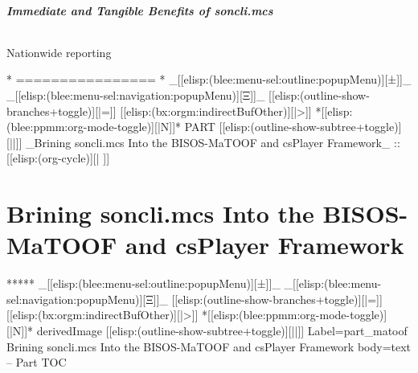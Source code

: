 \begin{whenOrg}
\begin{verblatex}

\begin{frame}[fragile,plain,label=soncliBenefits]
    \frametitle{Immediate and Tangible Benefits of soncli.mcs}
    \framesubtitle{}


    Nationwide reporting




\end{frame}
\end{verblatex}


\begin{whenOrg}
*      ================
*  _[[elisp:(blee:menu-sel:outline:popupMenu)][±]]_ _[[elisp:(blee:menu-sel:navigation:popupMenu)][Ξ]]_ [[elisp:(outline-show-branches+toggle)][|=]] [[elisp:(bx:orgm:indirectBufOther)][|>]] *[[elisp:(blee:ppmm:org-mode-toggle)][|N]]*  PART       [[elisp:(outline-show-subtree+toggle)][||]]   _Brining soncli.mcs Into the BISOS-MaTOOF and csPlayer Framework_ ::  [[elisp:(org-cycle)][| ]]
\end{whenOrg}

\newpage
\part{Brining soncli.mcs Into the BISOS-MaTOOF and csPlayer Framework}


\begin{whenOrg}
*****  _[[elisp:(blee:menu-sel:outline:popupMenu)][±]]_ _[[elisp:(blee:menu-sel:navigation:popupMenu)][Ξ]]_ [[elisp:(outline-show-branches+toggle)][|=]] [[elisp:(bx:orgm:indirectBufOther)][|>]] *[[elisp:(blee:ppmm:org-mode-toggle)][|N]]*  derivedImage [[elisp:(outline-show-subtree+toggle)][||]] Label=part_matoof Brining soncli.mcs Into the BISOS-MaTOOF and csPlayer Framework body=text -- Part TOC
\end{whenOrg}


\end{whenOrg}
